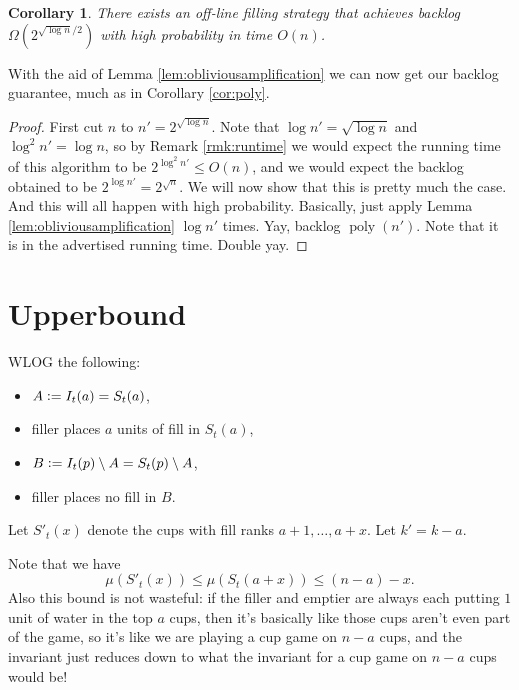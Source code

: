 \documentclass[twocolumn]{article}[11pt]
\DeclareMathOperator{\poly}{\text{poly}}
\newcommand{\defeq}{\vcentcolon=}
\newtheorem{corollary}{Corollary}
\begin{document}
\begin{corollary}
  \label{cor:randalmostpoly}
  There exists an off-line filling strategy that achieves backlog
  $\Omega(2^{\sqrt{\log n}/2})$ with high probability in time $O(n)$.
\end{corollary}

With the aid of Lemma \ref{lem:obliviousamplification} we can now get our
backlog guarantee, much as in Corollary \ref{cor:poly}.
\begin{proof}%
  First cut $n$ to $n' =2^{\sqrt{\log n}}$. Note that $\log n' = \sqrt{\log n}$
  and $\log^2 n' = \log n$, so by Remark \ref{rmk:runtime} we would expect the
  running time of this algorithm to be $2^{\log^2 n'} \le O(n)$, and we would
  expect the backlog obtained to be $2^{\log n'} = 2^{\sqrt{n}}$. We will now
  show that this is pretty much the case. And this will all happen with high
  probability.
  Basically, just apply Lemma \ref{lem:obliviousamplification} $\log n'$ times.
  Yay, backlog $\poly(n')$. Note that it is in the advertised running time.
  Double yay.
 
\end{proof}



\section{Upperbound}

  {\color{red} WLOG the following:}
  \begin{itemize}
    \item $A \defeq I_t(a) = S_t(a)$, 
    \item filler places $a$ units of fill in $S_t(a)$,
    \item $B \defeq I_t(p) \setminus A = S_t(p) \setminus A$,
    \item filler places no fill in $B$.
  \end{itemize}

  Let $S'_t(x)$ denote the cups with fill ranks $a+1, \ldots, a+x$. Let $k' =
  k-a$.

  Note that we have $$\mu(S'_t(x))\le \mu(S_t(a+x)) \le (n-a)-x.$$
  Also this bound is not wasteful: if the filler and emptier
  are always each putting $1$ unit of water in the top $a$ cups, then it's
  basically like those cups aren't even part of the game, so it's like we are
  playing a cup game on $n-a$ cups, and the invariant just reduces down to what
  the invariant for a cup game on $n-a$ cups would be!
\end{document}
